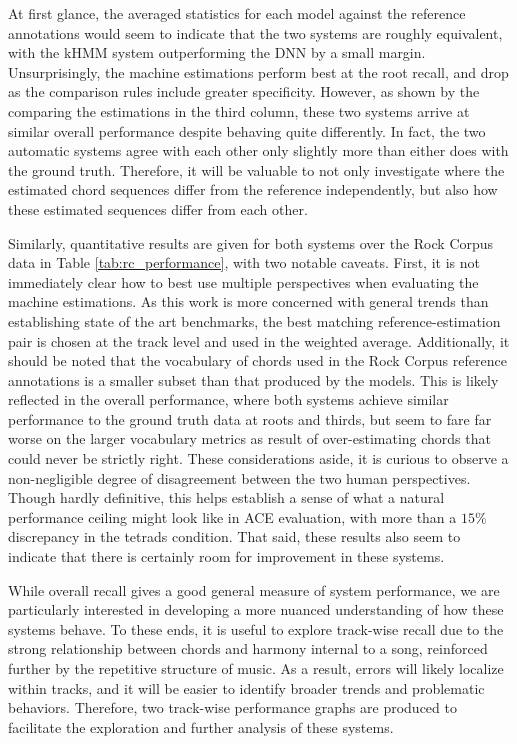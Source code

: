 \documentclass{article}
\begin{document}
At first glance, the averaged statistics for each model against the reference annotations would seem to indicate that the two systems are roughly equivalent, with the kHMM system outperforming the DNN by a small margin.
Unsurprisingly, the machine estimations perform best at the root recall, and drop as the comparison rules include greater specificity.
However, as shown by the comparing the estimations in the third column, these two systems arrive at similar overall performance despite behaving quite differently.
In fact, the two automatic systems agree with each other only slightly more than either does with the ground truth.
Therefore, it will be valuable to not only investigate where the estimated chord sequences differ from the reference independently, but also how these estimated sequences differ from each other.


Similarly, quantitative results are given for both systems over the Rock Corpus data in Table \ref{tab:rc_performance}, with two notable caveats.
First, it is not immediately clear how to best use multiple perspectives when evaluating the machine estimations.
As this work is more concerned with general trends than establishing state of the art benchmarks, the best matching reference-estimation pair is chosen at the track level and used in the weighted average.
Additionally, it should be noted that the vocabulary of chords used in the Rock Corpus reference annotations is a smaller subset than that produced by the models.
This is likely reflected in the overall performance, where both systems achieve similar performance to the ground truth data at roots and thirds, but seem to fare far worse on the larger vocabulary metrics as result of over-estimating chords that could never be strictly right.
These considerations aside, it is curious to observe a non-negligible degree of disagreement between the two human perspectives.
Though hardly definitive, this helps establish a sense of what a natural performance ceiling might look like in ACE evaluation, with more than a $15\%$discrepancy in the tetrads condition.
That said, these results also seem to indicate that there is certainly room for improvement in these systems.

While overall recall gives a good general measure of system performance, we are particularly interested in developing a more nuanced understanding of how these systems behave.
To these ends, it is useful to explore track-wise recall due to the strong relationship between chords and harmony internal to a song, reinforced further by the repetitive structure of music.
As a result, errors will likely localize within tracks, and it will be easier to identify broader trends and problematic behaviors.
Therefore, two track-wise performance graphs are produced to facilitate the exploration and further analysis of these systems.
\end{document}
